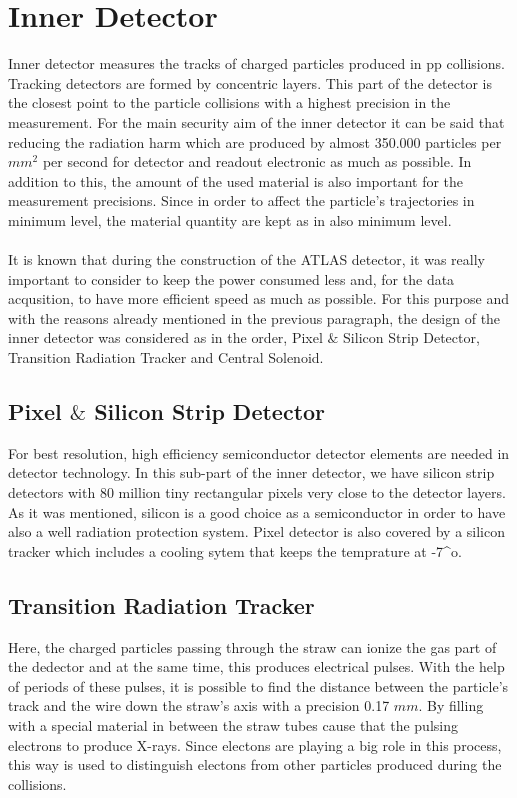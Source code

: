 \documentclass[a4paper,9pt]{article}
\begin{document}
\section{Inner Detector}
Inner detector measures the tracks of charged particles produced in pp collisions. Tracking detectors are formed by concentric layers. This part 
of the detector is the closest point to the particle collisions with a highest precision in the measurement. For the main security aim of the inner detector
it can be said that reducing the radiation harm which are produced by almost 350.000 particles per ${mm}^2$ per second for detector and 
readout electronic as much as possible. In addition to this, the amount of the used material is also important for the
measurement precisions. Since in order to affect the particle's trajectories in minimum level, the material quantity are kept as in
also minimum level.
\\\\
It is known that during the construction of the ATLAS detector, it was really important to consider to keep the power consumed less
and, for the data acqusition, to have more efficient speed as much as possible. For this purpose and with the reasons already
mentioned in the previous paragraph, the design of the inner detector was considered as in the order,
Pixel $\&$ Silicon Strip Detector, Transition Radiation Tracker and Central Solenoid.

\subsection{Pixel $\&$ Silicon Strip Detector}
For best resolution, high efficiency semiconductor detector elements are needed in detector technology. In this sub-part of the inner
detector, we have silicon strip detectors with 80 million tiny rectangular pixels very close to the detector layers. As it was mentioned,
silicon is a good choice as a semiconductor in order to have also a well radiation protection system. 
Pixel detector is also covered by a silicon tracker which includes a cooling sytem that keeps the temprature at -7^{o}.

\subsection{Transition Radiation Tracker}
Here, the charged particles passing through the straw can ionize the gas part of the dedector and at the same time, this produces electrical
pulses.  With the help of periods of these pulses, it is possible to find the distance between the particle's track and the wire down the 
straw's axis with a precision 0.17 $mm$. By filling with a special material in between the straw tubes cause that the pulsing electrons
to produce X-rays. Since electons are playing a big role in this process, this way is used to distinguish electons from other particles
produced during the collisions.
\end{document}
